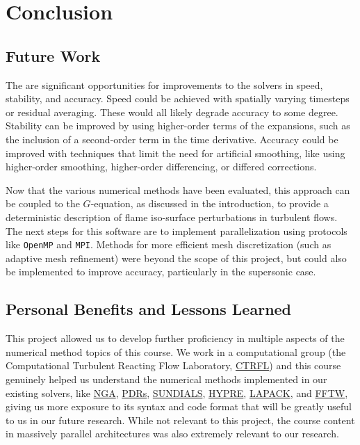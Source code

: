 \documentclass{homework}
\begin{document}
\section{\textbf{Conclusion}}

\subsection{\textbf{Future Work}} The are significant opportunities for improvements to the solvers in speed, stability, and accuracy. Speed could be achieved with spatially varying timesteps or residual averaging. These would all likely degrade accuracy to some degree. Stability can be improved by using higher-order terms of the expansions, such as the inclusion of a second-order term in the time derivative. Accuracy could be improved with techniques that limit the need for artificial smoothing, like using higher-order smoothing, higher-order differencing, or differed corrections. 

Now that the various numerical methods have been evaluated, this approach can be coupled to the $G$-equation, as discussed in the introduction, to provide a deterministic description of flame iso-surface perturbations in turbulent flows. The next steps for this software are to implement parallelization using protocols like \texttt{OpenMP} and \texttt{MPI}.
Methods for more efficient mesh discretization (such as adaptive mesh refinement) were beyond the scope of this project, but could also be implemented to improve accuracy, particularly in the supersonic case.

\subsection{\textbf{Personal Benefits and Lessons Learned}} 
\noindent This project allowed us to develop further proficiency in multiple aspects of the numerical method topics of this course. We work in a computational group (the Computational Turbulent Reacting Flow Laboratory, \href{https://ctrfl.princeton.edu/}{CTRFL}) and this course genuinely helped us understand the numerical methods implemented in our existing solvers, like \href{https://github.com/desjardi/NGA2}{NGA}, \href{https://ctrfl.princeton.edu/software/}{PDRs}, \href{https://computing.llnl.gov/projects/sundials}{SUNDIALS}, \href{https://computing.llnl.gov/projects/hypre-scalable-linear-solvers-multigrid-methods}{HYPRE}, \href{https://www.netlib.org/lapack/}{LAPACK}, and \href{https://www.fftw.org/}{FFTW}, giving us more exposure to its syntax and code format that will be greatly useful to us in our future research. While not relevant to this project, the course content in massively parallel architectures was also extremely relevant to our research.
\end{document}
